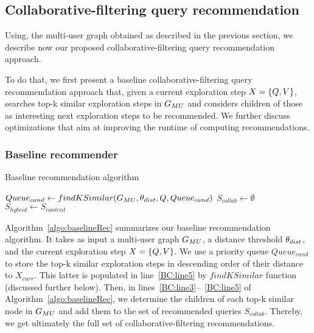 \subsection{Collaborative-filtering query recommendation}
\label{sec:finding}
Using, the multi-user graph obtained as described in the previous section, we describe now our proposed collaborative-filtering query recommendation approach.

To do that, we first present a baseline collaborative-filtering query recommendation approach that, given a current exploration step $X=\{Q,V\}{}$, searches top-k similar exploration steps in $G_{MU}{}$ and considers children of those as interesting next exploration steps to be recommended. We further discuss optimizations that aim at improving the runtime of computing recommendations.

\subsubsection {Baseline recommender}
\label{sec:basic-rec}

   \begin{algorithm}[t]
\caption{Baseline  recommendation algorithm}
\label{algo:baselineRec}
 $Queue_{cand} \leftarrow findKSimilar(G_{MU}, \theta_{dist}, Q, Queue_{cand})$\;
  $S_{collab} \leftarrow \emptyset$\;
$S_{hybrid}\leftarrow S_{content}$ {   } \label{BC:line6}
\end{algorithm}




Algorithm~\ref{algo:baselineRec} summarizes our baseline recommendation algorithm. It takes as input a multi-user graph $G_{MU}$, a distance threshold $\theta_{dist}$, and the current exploration step $X=\{Q,V\}$.
We use a priority queue $Queue_{cand}$ to store the top-k similar exploration steps in descending order of their distance to $X_{curr}$. 
This latter is populated in line~\ref{BC:line5} by $findKSimilar$ function (discussed further below). 
Then, in lines~\ref{BC:line3}--~\ref{BC:line5} of Algorithm~\ref{algo:baselineRec}, we determine the children of each top-k similar node in $G_{MU}{}$ and add them to the set of recommended queries $S_{collab}$. 
Thereby, we get ultimately the full set of collaborative-filtering recommendations.
 


